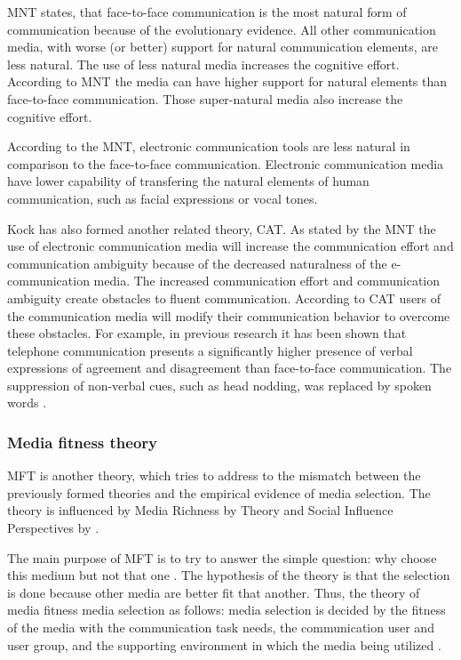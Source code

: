 \documentclass[english,12pt,a4paper,pdftex]{article}
\begin{document}

\Ac{MNT} states, that face-to-face communication is the most natural form of communication because of the evolutionary evidence. All other communication media, with worse (or better) support for natural communication elements, are less natural. The use of less natural media increases the cognitive effort. According to \ac{MNT} the media can have higher support for natural elements than face-to-face communication. Those super-natural media also increase the cognitive effort. \citep{kock2005} \citep{kock2004}

According to the \ac{MNT}, electronic communication tools are less natural in comparison to the face-to-face communication. Electronic communication media have lower capability of transfering the natural elements of human communication, such as facial expressions or vocal tones.

Kock has also formed another related theory, \ac{CAT}. As stated by the \ac{MNT} the use of electronic communication media will increase the communication effort and communication ambiguity because of the decreased naturalness of the e-communication media. The increased communication effort and communication ambiguity create obstacles to fluent communication. According to \ac{CAT} users of the communication media will modify their communication behavior to overcome these obstacles. For example, in previous research it has been shown that telephone communication presents a significantly higher presence of verbal expressions of agreement and disagreement than face-to-face communication. The suppression of non-verbal cues, such as head nodding, was replaced by spoken words \citep{kock2007}.

\subsubsection{Media fitness theory}

\ac{MFT} is another theory, which tries to address to the mismatch between the previously formed theories and the empirical evidence of media selection. The theory is influenced by Media Richness by \citet{daft1986} Theory and Social Influence Perspectives by \citet{fulk1987}.

The main purpose of \ac{MFT} is to try to answer the simple question: why choose this medium but not that one \citep{higa2007}. The hypothesis of the theory is that the selection is done because other media are better fit that another. Thus, the theory of media fitness media selection as follows: media selection is decided by the fitness of the media with the communication task needs, the communication user and user group, and the supporting environment in which the media being utilized \citep{higa2007}.
\end{document}
